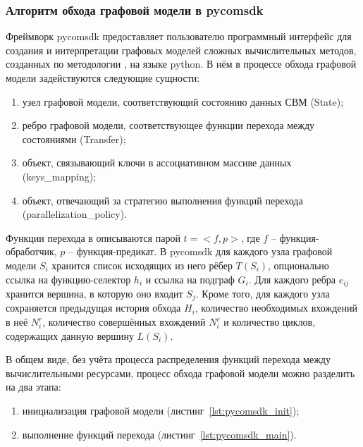 \def\notedate{2023.01.22}
\def\currentauthor{Тришин И.В. (РК6-11М)}
\subsubsection{Алгоритм обхода графовой модели в pycomsdk}
Фреймворк pycomsdk предоставляет пользователю программный интерфейс для создания и интерпретации графовых моделей сложных вычислительных методов, созданных по методологии , на языке python. В нём в процессе обхода графовой модели задействуются следующие сущности:
\begin{enumerate}[label=\arabic*)]
	\item узел графовой модели, соответствующий состоянию данных СВМ (State);
	\item ребро графовой модели, соответствующее функции перехода между состояниями (Transfer);
	\item объект, связывающий ключи в ассоциативном массиве данных (keys_mapping);
	\item объект, отвечающий за стратегию выполнения функций перехода (parallelization_policy).
\end{enumerate}
Функции перехода в  описываются парой $t = <f, p>$, где $f$ -- функция-обработчик, $p$ -- функция-предикат.
В pycomsdk для каждого узла графовой модели $S_i$ хранится список исходящих из него рёбер $T(S_i)$, опционально ссылка на функцию-селектор\cite{SokolovPershin2018} $h_i$ и ссылка на подграф $G_i$. Для каждого ребра $e_{ij}$ хранится вершина, в которую оно входит $S_j$. Кроме того, для каждого узла сохраняется предыдущая история обхода $H_i$, количество необходимых вхождений в неё $N_i^r$, количество совершённых вхождений $N_i^c$ и количество циклов, содержащих данную вершину $L(S_i)$.

В общем виде, без учёта процесса распределения функций перехода между вычислительными ресурсами, процесс обхода графовой модели можно разделить на два этапа:
\begin{enumerate}[label=\arabic*)]
	\item инициализация графовой модели (листинг~\ref{lst:pycomsdk_init});
	\item выполнение функций перехода (листинг~\ref{lst:pycomsdk_main}).
\end{enumerate}

